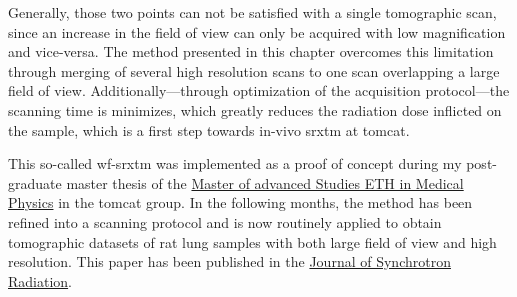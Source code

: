 Generally, those two points can not be satisfied with a single tomographic scan, since an increase in the field of view can only be acquired with low magnification and vice-versa. The method presented in this chapter overcomes this limitation through merging of several high resolution scans to one scan overlapping a large field of view. Additionally---through optimization of the acquisition protocol---the scanning time is minimizes, which greatly reduces the radiation dose inflicted on the sample, which is a first step towards in-vivo \ac{srxtm} at \ac{tomcat}.

This so-called \ac{wf-srxtm} was implemented as a proof of concept during my post-graduate master thesis of the \href{http://www.biomed.ee.ethz.ch/nds/}{Master of advanced Studies ETH in Medical Physics} in the \ac{tomcat} group. In the following months, the method has been refined into a scanning protocol and is now routinely applied to obtain tomographic datasets of rat lung samples with both large field of view and high resolution. This paper has been published in the \href{http://journals.iucr.org/s/}{Journal of Synchrotron Radiation}.

